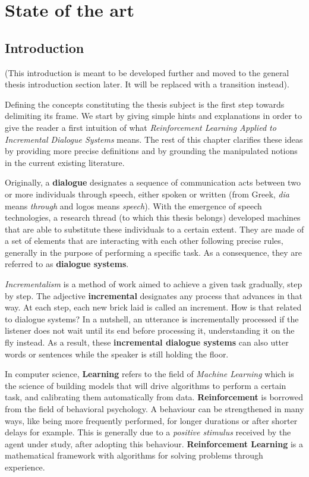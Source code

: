 \chapter{State of the art}

\label{ch:stateofart}

\section{Introduction}
				
				(This introduction is meant to be developed further and moved to the general thesis introduction section later. It will be replaced with a transition instead).

        Defining the concepts constituting the thesis subject is the first step towards delimiting its frame. We start by giving simple hints and explanations in order to give the reader a first intuition of what \textit{Reinforcement Learning Applied to Incremental Dialogue Systems} means. The rest of this chapter clarifies these ideas by providing more precise definitions and by grounding the manipulated notions in the current existing literature.

        Originally, a \textbf{dialogue} designates a sequence of communication acts between two or more individuals through speech, either spoken or written (from Greek, \textit{dia} means \textit{through} and logos means \textit{speech}). With the emergence of speech technologies, a research thread (to which this thesis belongs) developed machines that are able to substitute these individuals to a certain extent. They are made of a set of elements that are interacting with each other following precise rules, generally in the purpose of performing a specific task. As a consequence, they are referred to as \textbf{dialogue systems}.

        \textit{Incrementalism} is a method of work aimed to achieve a given task gradually, step by step. The adjective \textbf{incremental} designates any process that advances in that way. At each step, each new brick laid is called an increment. How is that related to dialogue systems? In a nutshell, an utterance is incrementally processed if the listener does not wait until its end before processing it, understanding it on the fly instead. As a result, these \textbf{incremental dialogue systems} can also utter words or sentences while the speaker is still holding the floor.

        In computer science, \textbf{Learning} refers to the field of \textit{Machine Learning} which is the science of building models that will drive algorithms to perform a certain task, and calibrating them automatically from data. \textbf{Reinforcement} is borrowed from the field of behavioral psychology. A behaviour can be strengthened in many ways, like being more frequently performed, for longer durations or after shorter delays for example. This is generally due to a \textit{positive stimulus} received by the agent under study, after adopting this behaviour. \textbf{Reinforcement Learning} is a mathematical framework with algorithms for solving problems through experience.

